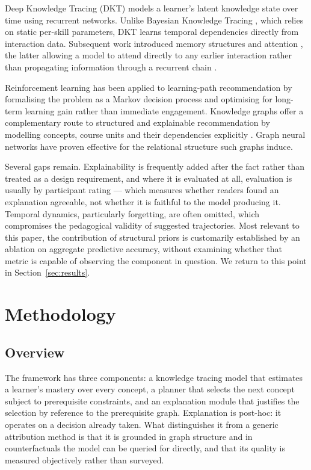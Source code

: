 \documentclass[conference]{IEEEtran}
\begin{document}
Deep Knowledge Tracing (DKT) \cite{piech2015dkt} models a learner's latent knowledge
state over time using recurrent networks. Unlike Bayesian Knowledge Tracing
\cite{corbett1994knowledge}, which relies on static per-skill parameters, DKT learns
temporal dependencies directly from interaction data. Subsequent work introduced memory
structures \cite{zhang2017dkvmn} and attention \cite{pandey2019sakt, ghosh2020akt},
the latter allowing a model to attend directly to any earlier interaction rather than
propagating information through a recurrent chain \cite{vaswani2017attention}.

Reinforcement learning has been applied to learning-path recommendation by formalising
the problem as a Markov decision process and optimising for long-term learning gain
rather than immediate engagement. Knowledge graphs offer a complementary route to
structured and explainable recommendation by modelling concepts, course units and their
dependencies explicitly \cite{li2026survey}. Graph neural networks have proven effective
for the relational structure such graphs induce.

Several gaps remain. Explainability is frequently added after the fact rather than
treated as a design requirement, and where it is evaluated at all, evaluation is usually
by participant rating --- which measures whether readers found an explanation agreeable,
not whether it is faithful to the model producing it. Temporal dynamics, particularly
forgetting, are often omitted, which compromises the pedagogical validity of suggested
trajectories. Most relevant to this paper, the contribution of structural priors is
customarily established by an ablation on aggregate predictive accuracy, without
examining whether that metric is capable of observing the component in question. We
return to this point in Section~\ref{sec:results}.

\section{Methodology}
\label{sec:method}

\subsection{Overview}

The framework has three components: a knowledge tracing model that estimates a learner's
mastery over every concept, a planner that selects the next concept subject to
prerequisite constraints, and an explanation module that justifies the selection by
reference to the prerequisite graph. Explanation is post-hoc: it operates on a decision
already taken. What distinguishes it from a generic attribution method is that it is
grounded in graph structure and in counterfactuals the model can be queried for
directly, and that its quality is measured objectively rather than surveyed.
\end{document}
